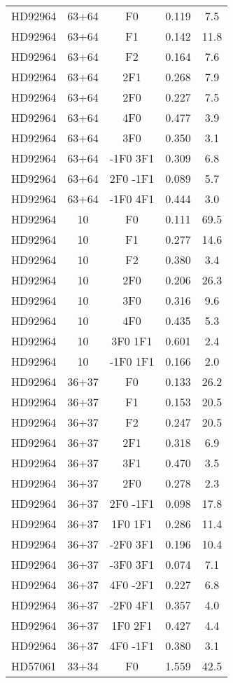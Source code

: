 \begin{table*}
\begin{tabular}{l c c c c}
\hline
HD92964 & 63+64 & F0 & 0.119 & 7.5\\ 
HD92964 & 63+64 & F1 & 0.142 & 11.8\\ 
HD92964 & 63+64 & F2 & 0.164 & 7.6\\ 
HD92964 & 63+64 & 2F1 & 0.268 & 7.9\\ 
HD92964 & 63+64 & 2F0 & 0.227 & 7.5\\ 
HD92964 & 63+64 & 4F0 & 0.477 & 3.9\\ 
HD92964 & 63+64 & 3F0 & 0.350 & 3.1\\ 
HD92964 & 63+64 & -1F0 3F1 & 0.309 & 6.8\\ 
HD92964 & 63+64 & 2F0 -1F1 & 0.089 & 5.7\\ 
HD92964 & 63+64 & -1F0 4F1 & 0.444 & 3.0\\ 
\hline
HD92964 & 10 & F0 & 0.111 & 69.5\\ 
HD92964 & 10 & F1 & 0.277 & 14.6\\ 
HD92964 & 10 & F2 & 0.380 & 3.4\\ 
HD92964 & 10 & 2F0 & 0.206 & 26.3\\ 
HD92964 & 10 & 3F0 & 0.316 & 9.6\\ 
HD92964 & 10 & 4F0 & 0.435 & 5.3\\ 
HD92964 & 10 & 3F0 1F1 & 0.601 & 2.4\\ 
HD92964 & 10 & -1F0 1F1 & 0.166 & 2.0\\ 
\hline
HD92964 & 36+37 & F0 & 0.133 & 26.2\\ 
HD92964 & 36+37 & F1 & 0.153 & 20.5\\ 
HD92964 & 36+37 & F2 & 0.247 & 20.5\\ 
HD92964 & 36+37 & 2F1 & 0.318 & 6.9\\ 
HD92964 & 36+37 & 3F1 & 0.470 & 3.5\\ 
HD92964 & 36+37 & 2F0 & 0.278 & 2.3\\ 
HD92964 & 36+37 & 2F0 -1F1 & 0.098 & 17.8\\ 
HD92964 & 36+37 & 1F0 1F1 & 0.286 & 11.4\\ 
HD92964 & 36+37 & -2F0 3F1 & 0.196 & 10.4\\ 
HD92964 & 36+37 & -3F0 3F1 & 0.074 & 7.1\\ 
HD92964 & 36+37 & 4F0 -2F1 & 0.227 & 6.8\\ 
HD92964 & 36+37 & -2F0 4F1 & 0.357 & 4.0\\ 
HD92964 & 36+37 & 1F0 2F1 & 0.427 & 4.4\\ 
HD92964 & 36+37 & 4F0 -1F1 & 0.380 & 3.1\\ 
\hline
HD57061 & 33+34 & F0 & 1.559 & 42.5\\ 

\end{tabular}
\end{table*}
